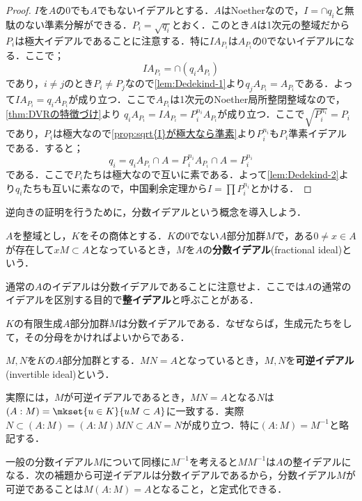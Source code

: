 \begin{proof}
	$I$を$A$の0でも$A$でもないイデアルとする．$A$はNoetherなので，$I=\cap q_i$と無駄のない準素分解ができる．$P_i=\sqrt{q_i}$とおく．このとき$A$は1次元の整域だから$P_i$は極大イデアルであることに注意する．特に$IA_{P_i}$は$A_{P_i}$の0でないイデアルになる．ここで；
	\[IA_{P_i}=\cap (q_iA_{P_i})\]
	であり，$i\neq j$のとき$P_i\neq P_j$なので\ref{lem:Dedekind-1}より$q_jA_{P_i}=A_{P_i}$である．よって$IA_{P_i}=q_iA_{P_i}$が成り立つ．ここで$A_{P_i}$は1次元のNoether局所整閉整域なので，\ref{thm:DVRの特徴づけ}より $q_iA_{P_i}=IA_{P_i}=P_i^{n_i}A_{P_i}$が成り立つ．ここで$\sqrt{P_i^{n_i}}=P_i$であり，$P_i$は極大なので\ref{prop:sqrt{I}が極大なら準素}より$P_i^{n_i}$も$P_i$準素イデアルである．すると；
	\[q_i=q_iA_{P_i}\cap A=P_i^{n_i}A_{P_i}\cap A=P_i^{n_i}\]
	である．ここで$P_i$たちは極大なので互いに素である．よって\ref{lem:Dedekind-2}より$q_i$たちも互いに素なので，中国剰余定理から$I=\prod P_i^{n_i}$とかける．
\end{proof}

逆向きの証明を行うために，分数イデアルという概念を導入しよう．

\begin{defi}[分数イデアル]
	$A$を整域とし，$K$をその商体とする．$K$の0でない$A$部分加群$M$で，ある$0\neq x\in A$が存在して$xM\subset A$となっているとき，$M$を$A$の\textbf{分数イデアル}(fractional ideal)という．
\end{defi}

通常の$A$のイデアルは分数イデアルであることに注意せよ．ここでは$A$の通常のイデアルを区別する目的で\textbf{整イデアル}と呼ぶことがある．

$K$の有限生成$A$部分加群$M$は分数イデアルである．なぜならば，生成元たちをして，その分母をかければよいからである．

\begin{defi}[可逆イデアル]
	$M,N$を$K$の$A$部分加群とする．$MN=A$となっているとき，$M,N$を\textbf{可逆イデアル}(invertible ideal)という．
\end{defi}
	実際には，$M$が可逆イデアルであるとき，$MN=A$となる$N$は$(A:M)=\mkset{u\in K}{uM\subset A}$に一致する．実際$N\subset (A:M)=(A:M)MN\subset AN=N$が成り立つ．特に$(A:M)=M^{-1}$と略記する．
	
	一般の分数イデアル$M$について同様に$M^{-1}$を考えると$MM^{-1}$は$A$の整イデアルになる．次の補題から可逆イデアルは分数イデアルであるから，分数イデアル$M$が可逆であることは$M(A:M)=A$となること，と定式化できる．

